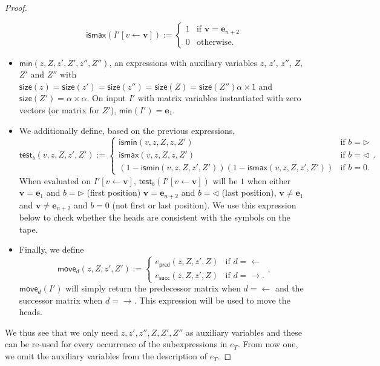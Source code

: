 \begin{proof}
\begin{itemize}
	$$\mathsf{ismax}(I'[v\gets\mathbf{v}]):=\begin{cases} 1 & \text{if $\mathbf{v}=\mathbf{e}_{n+2}$}\\
		0 & \text{otherwise}.
		\end{cases}$$
	\item $\mathsf{min}(z,Z,z',Z',z'',Z'')$, an expressions with
	auxiliary variables $z$, $z'$, $z''$, $Z$, $Z'$ and $Z''$ with $\mathsf{size}(z)=\mathsf{size}(z')=\mathsf{size}(z'')=\mathsf{size}(Z)=\mathsf{size}(Z'')\alpha\times 1$ and $\mathsf{size}(Z')=\alpha\times\alpha$. On input $I'$ with 
	matrix variables instantiated with zero vectors (or matrix for $Z'$),
 	 $\mathsf{min}(I')=\mathbf{e}_1$. 
	 		\item We additionally define, based on the previous expressions, 
			$$\mathsf{test}_b(v,z,Z,z',Z'):=\begin{cases} \mathsf{ismin}(v,z,Z,z,Z') & \text{if $b=\rhd$}\\
     \mathsf{ismax}(v,z,Z,z,Z') & \text{if $b=\lhd$}\\
	 (1-\mathsf{ismin}(v,z,Z,z',Z'))(1-\mathsf{ismax}(v,z,Z,z',Z')) & \text{if $b=0$}.
		\end{cases}.$$
	When evaluated on $I'[v\gets\mathbf{v}]$, $\mathsf{test}_b(I'[v\gets\mathbf{v}])$ will be $1$ when either
	$\mathbf{v}=\mathbf{e}_{1}$ and $b=\rhd$ (first position)
	$\mathbf{v}=\mathbf{e}_{n+2}$ and $b=\lhd$ (last position),
	$\mathbf{v}\neq \mathbf{e}_{1}$ and $\mathbf{v}\neq \mathbf{e}_{n+2}$  and $b=0$ (not first or last position). We use this expression below to check whether the heads are consistent with the symbols on the tape.
	
	
 \item Finally, we define
 $$
 \mathsf{move}_d(z,Z,z',Z'):=\begin{cases}
 e_{\mathsf{pred}}(z,Z,z',Z) & \text{if $d=\gets$}\\
  e_{\mathsf{succ}}(z,Z,z',Z) & \text{if $d=\to$}. 
 \end{cases},
 $$
 $\mathsf{move}_d(I')$ will simply return the predecessor matrix when $d=\gets$ and the successor matrix when $d=\to$. This expression will be used to move the heads.
\end{itemize}
We thus see that we only need $z,z',z'',Z,Z',Z''$ as auxiliary variables and these can be re-used for every occurrence of the subexpressions in $e_T$. From now one, we omit the auxiliary variables from the description of $e_T$.


\end{proof}
